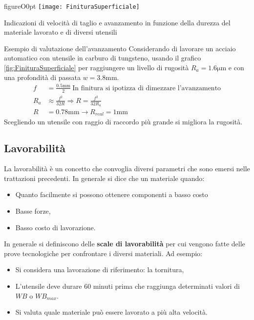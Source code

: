 \begin{wrapfloat}{figure}{O}{0pt}
\texttt{[image: FinituraSuperficiale]}
\caption{Indicazioni di velocità di taglio e avanzamento in funzione della durezza del materiale lavorato e di diversi utensili}
\label{fig:FinituraSuperficiale}
\end{wrapfloat}

\begin{example}{Esempio di valutazione dell'avanzamento}
Considerando di lavorare un acciaio automatico con utensile in carburo di tungsteno, usando il grafico \ref{fig:FinituraSuperficiale} per raggiungere un livello di rugosità $R_a = 1.6\unit{\um}$ e con una profondità di passata $w = 3.8\unit{\mm}$.
\begin{align*}
f &= \frac{0.5\unit{\mm}}{2} \: \text{In finitura si ipotizza di dimezzare l'avanzamento}\\
R_a &\approx \frac{f^2}{32R} \Rightarrow R = \frac{f^2}{32 R_a}\\
R &= 0.78\unit{\mm} \rightarrow R_{real} = 1\unit{\mm}
\end{align*}
Scegliendo un utensile con raggio di raccordo più grande si migliora la rugosità.
\end{example}

\subsection{Lavorabilità}
La lavorabilità è un concetto che convoglia diversi parametri che sono emersi nelle trattazioni precedenti.
In generale si dice che un materiale quando:
\begin{itemize}
\item Quanto facilmente si possono ottenere componenti a basso costo
\item Basse forze,
\item Basso costo di lavorazione.
\end{itemize}

In generale si definiscono delle \textbf{scale di lavorabilità} per cui vengono fatte delle prove tecnologiche per confrontare i diversi materiali.
Ad esempio:
\begin{itemize}
\item Si considera una lavorazione di riferimento: la tornitura,
\item L'utensile deve durare 60 minuti prima che raggiunga determinati valori di $WB$ o $WB_{max}$.
\item Si valuta quale materiale può essere lavorato a più alta velocità.
\end{itemize}

